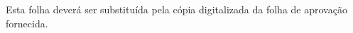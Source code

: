 

\begin{agradecimentos}

Esta folha deverá ser substituída pela cópia digitalizada da folha de aprovação fornecida.

\end{agradecimentos}





\clearpage

